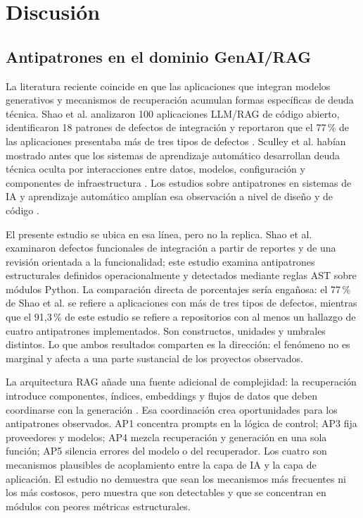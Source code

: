 \section{Discusión}

\subsection{Antipatrones en el dominio GenAI/RAG}

La literatura reciente coincide en que las aplicaciones que integran modelos generativos y mecanismos de recuperación acumulan formas específicas de deuda técnica. Shao et al. analizaron 100 aplicaciones LLM/RAG de código abierto, identificaron 18 patrones de defectos de integración y reportaron que el 77\,\% de las aplicaciones presentaba más de tres tipos de defectos \cite{shao_are_2024}. Sculley et al. habían mostrado antes que los sistemas de aprendizaje automático desarrollan deuda técnica oculta por interacciones entre datos, modelos, configuración y componentes de infraestructura \cite{sculley_hidden_2015}. Los estudios sobre antipatrones en sistemas de IA y aprendizaje automático amplían esa observación a nivel de diseño y de código \cite{bogner_characterizing_2021,gesi_code_2022,zhang_code_2022,oort_prevalence_2021,jebnoun_scent_2020,muralidhar_using_2021}.

El presente estudio se ubica en esa línea, pero no la replica. Shao et al. examinaron defectos funcionales de integración a partir de reportes y de una revisión orientada a la funcionalidad; este estudio examina antipatrones estructurales definidos operacionalmente y detectados mediante reglas AST sobre módulos Python. La comparación directa de porcentajes sería engañosa: el 77\,\% de Shao et al. se refiere a aplicaciones con más de tres tipos de defectos, mientras que el 91,3\,\% de este estudio se refiere a repositorios con al menos un hallazgo de cuatro antipatrones implementados. Son constructos, unidades y umbrales distintos. Lo que ambos resultados comparten es la dirección: el fenómeno no es marginal y afecta a una parte sustancial de los proyectos observados.

La arquitectura RAG añade una fuente adicional de complejidad: la recuperación introduce componentes, índices, embeddings y flujos de datos que deben coordinarse con la generación \cite{lewis_retrieval-augmented_2021,sharma_retrieval-augmented_2025,oche_systematic_2025}. Esa coordinación crea oportunidades para los antipatrones observados. AP1 concentra prompts en la lógica de control; AP3 fija proveedores y modelos; AP4 mezcla recuperación y generación en una sola función; AP5 silencia errores del modelo o del recuperador. Los cuatro son mecanismos plausibles de acoplamiento entre la capa de IA y la capa de aplicación. El estudio no demuestra que sean los mecanismos más frecuentes ni los más costosos, pero muestra que son detectables y que se concentran en módulos con peores métricas estructurales.

